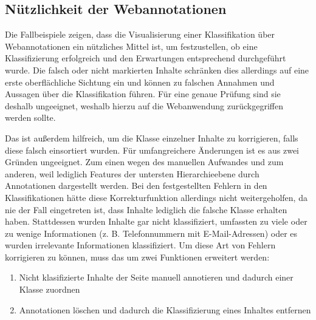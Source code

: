\subsection{Nützlichkeit der Webannotationen}
    Die Fallbeispiele zeigen, dass die Visualisierung einer Klassifikation
    über Webannotationen ein nützliches Mittel ist, um festzustellen,
    ob eine Klassifizierung erfolgreich und den Erwartungen entsprechend durchgeführt wurde.
    Die falsch oder nicht markierten Inhalte schränken dies allerdings
    auf eine erste oberflächliche Sichtung ein
    und können zu falschen Annahmen und Aussagen über die Klassifikation führen.
    Für eine genaue Prüfung sind sie deshalb ungeeignet,
    weshalb hierzu auf die Webanwendung zurückgegriffen werden sollte.

    Das {\annotatorPlugin} ist außerdem hilfreich,
    um die Klasse einzelner Inhalte zu korrigieren,
    falls diese falsch einsortiert wurden.
    Für umfangreichere Änderungen ist es aus zwei Gründen ungeeignet.
    Zum einen wegen des manuellen Aufwandes
    und zum anderen, weil lediglich Features der untersten Hierarchieebene
    durch Annotationen dargestellt werden.
    Bei den festgestellten Fehlern in den Klassifikationen hätte diese
    Korrekturfunktion allerdings nicht weitergeholfen,
    da nie der Fall eingetreten ist, dass Inhalte lediglich die falsche Klasse erhalten haben.
    Stattdessen wurden Inhalte gar nicht klassifiziert,
    umfassten zu viele oder zu wenige Informationen
    (z. B. Telefonnummern mit E-Mail-Adressen)
    oder es wurden irrelevante Informationen klassifiziert.
    Um diese Art von Fehlern korrigieren zu können,
    muss das {\annotatorPlugin} um zwei Funktionen erweitert werden:

    \begin{enumerate}
        \item Nicht klasifizierte Inhalte der Seite manuell annotieren und dadurch einer Klasse zuordnen
        \item Annotationen löschen und dadurch die Klassifizierung eines Inhaltes entfernen
    \end{enumerate}